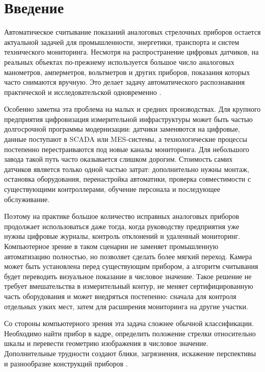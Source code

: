 \documentclass[a4paper,14pt]{extarticle}
\begin{document}

		\newpage
	\section{Введение}

Автоматическое считывание показаний аналоговых стрелочных приборов остается актуальной задачей для промышленности, энергетики, транспорта и систем технического мониторинга. Несмотря на распространение цифровых датчиков, на реальных объектах по-прежнему используется большое число аналоговых манометров, амперметров, вольтметров и других приборов, показания которых часто снимаются вручную. Это делает задачу автоматического распознавания практической и исследовательской одновременно \cite{schuetze2018,adsul2021,howells2021,reitsma2024}.

Особенно заметна эта проблема на малых и средних производствах. Для крупного предприятия цифровизация измерительной инфраструктуры может быть частью долгосрочной программы модернизации: датчики заменяются на цифровые, данные поступают в SCADA или MES-системы, а технологические процессы постепенно перестраиваются под новые каналы мониторинга. Для небольшого завода такой путь часто оказывается слишком дорогим. Стоимость самих датчиков является только одной частью затрат: дополнительно нужны монтаж, остановка оборудования, перенастройка автоматики, проверка совместимости с существующими контроллерами, обучение персонала и последующее обслуживание.

Поэтому на практике большое количество исправных аналоговых приборов продолжает использоваться даже тогда, когда руководству предприятия уже нужны цифровые журналы, контроль отклонений и удаленный мониторинг. Компьютерное зрение в таком сценарии не заменяет промышленную автоматизацию полностью, но позволяет сделать более мягкий переход. Камера может быть установлена перед существующим прибором, а алгоритм считывания будет переводить визуальное показание в числовое значение. Такое решение не требует вмешательства в измерительный контур, не меняет сертифицированную часть оборудования и может внедряться постепенно: сначала для контроля отдельных узких мест, затем для расширения мониторинга на другие участки.

Со стороны компьютерного зрения эта задача сложнее обычной классификации. Необходимо найти прибор в кадре, определить положение стрелки относительно шкалы и перевести геометрию изображения в числовое значение. Дополнительные трудности создают блики, загрязнения, искажение перспективы и разнообразие конструкций приборов \cite{howells2021,wang2022,reitsma2024,coords2023,sciRep2025}.
\end{document}
